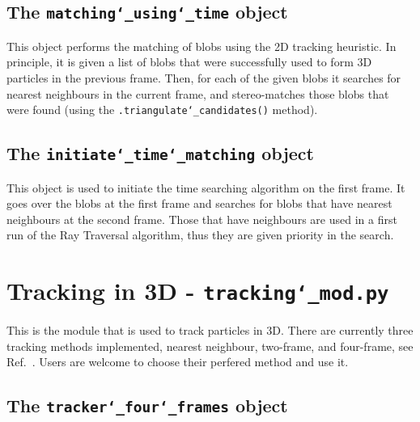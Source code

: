 \documentclass[10pt,a4paper]{article}
\begin{document}
\subsection{The \texttt{matching\char`_using\char`_time} object}

This object performs the matching of blobs using the 2D tracking heuristic. In principle, it is given a list of blobs that were successfully used to form 3D particles in the previous frame. Then, for each of the given blobs it searches for nearest neighbours in the current frame, and stereo-matches those blobs that were found (using the \texttt{.triangulate\char`_candidates()} method). 





\subsection{The \texttt{initiate\char`_time\char`_matching} object}

This object is used to initiate the time searching algorithm on the first frame. It goes over the blobs at the first frame and searches for blobs that have nearest neighbours at the second frame. Those that have neighbours are used in a first run of the Ray Traversal algorithm, thus they are given priority in the search.













\section{Tracking in 3D - \texttt{tracking\char`_mod.py}}

This is the module that is used to track particles in 3D. There are currently three tracking methods implemented, nearest neighbour, two-frame, and four-frame, see Ref.~\cite{Ouellette2006}. Users are welcome to choose their perfered method and use it.



\subsection{The \texttt{tracker\char`_four\char`_frames} object}\label{sec:four_frames}
\end{document}
